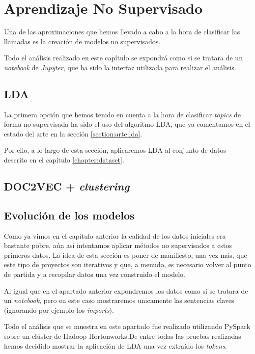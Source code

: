 \chapter{Aprendizaje No Supervisado}
\label{chapter:nosup}

Una de las aproximaciones que hemos llevado a cabo a la hora de clasificar las llamadas es la creación de modelos no supervisados. 



Todo el análisis realizado en este capítulo se expondrá como si se tratara de un \textit{notebook} de \textit{Jupyter}, que ha sido la interfaz utilizada para realizar el análisis.


\section{LDA}
La primera opción que hemos tenido en cuenta a la hora de clasificar \textit{topics} de forma no supervisada ha sido el uso del algoritmo LDA, que ya comentamos en el estado del arte en la sección \ref{section:arte:lda}.

Por ello, a lo largo de esta sección, aplicaremos LDA al conjunto de datos descrito en el capítulo \ref{chapter:dataset}. 







\section{DOC2VEC + \textit{clustering}}

\section{Evolución de los modelos}

Como ya vimos en el capítulo anterior la calidad de los datos iniciales era bastante pobre, aún así intentamos aplicar métodos no supervisados a estos primeros datos. La idea de esta sección es poner de manifiesto, una vez más, que este tipo de proyectos son iterativos y que, a menudo, es necesario volver al punto de partida y a recopilar datos una vez construido el modelo.


Al igual que en el apartado anterior expondremos los datos como si se tratara de un \textit{notebook}, pero en este caso mostraremos unicamente las sentencias claves (ignorando por ejemplo los \textit{imports}). 

Todo el análisis que se muestra en este apartado fue realizado utilizando PySpark sobre un clúster de Hadoop Hortonworks.De entre todas las pruebas realizadas hemos decidido mostrar la aplicación de LDA una vez extraído los \textit{tokens}. 

